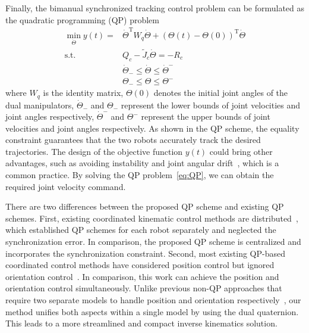 \documentclass[journal,twoside,web]{ieeecolor}
\begin{document}
Finally, the bimanual synchronized tracking control problem can be formulated as the quadratic programming (QP) problem
\begin{equation}
\begin{aligned}
\min_{\dot{\Theta}} y(t) = &\dot{\Theta}^\mathrm{T} W_q \dot{\Theta} + (\Theta(t)-\Theta(0))^\mathrm{T} \dot{\Theta} \\
\text{s.t.  } & Q_c - \tilde J_c \dot{\Theta} = -R_c \\
& \dot{\Theta}_- \le \dot{\Theta} \le \dot{\Theta}^- \\
& \Theta_- \le \Theta \le \Theta^-
\end{aligned}
\label{eq:QP}
\end{equation}
where $W_q$ is the identity matrix, $\Theta(0)$ denotes the initial joint angles of the dual manipulators, $\dot{\Theta}_-$ and $\Theta_-$ represent the lower bounds of joint velocities and joint angles respectively, $\dot{\Theta}^-$ and $\Theta^-$ represent the upper bounds of joint velocities and joint angles respectively. As shown in the QP scheme, the equality constraint guarantees that the two robots accurately track the desired trajectories. The design of the objective function $y(t)$ could bring other advantages, such as avoiding instability and joint angular drift~\cite{Zhang2004TSMC}, which is a common practice. By solving the QP problem~\eqref{eq:QP}, we can obtain the required joint velocity command. 

There are two differences between the proposed QP scheme and existing QP schemes. First, existing coordinated kinematic control methods are distributed~\cite{Zhang2021TNNLS,Jia2020Robotica,Zhan2024TNNLS}, which established QP schemes for each robot separately and neglected the synchronization error. In comparison, the proposed QP scheme is centralized and incorporates the synchronization constraint. Second, most existing QP-based coordinated control methods have considered position control but ignored orientation control~\cite{Zhang2021TNNLS,Jia2020Robotica,Zhan2024TNNLS}. In comparison, this work can achieve the position and orientation control simultaneously. Unlike previous non-QP approaches that require two separate models to handle position and orientation respectively~\cite{YANG2021108007}, our method unifies both aspects within a single model by using the dual quaternion. This leads to a more streamlined and compact inverse kinematics solution.
\end{document}
